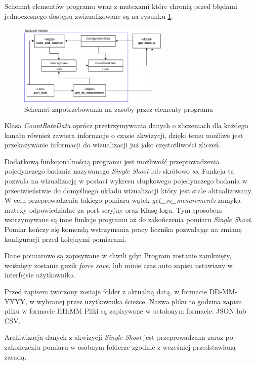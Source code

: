 \documentclass[a4paper,12pt]{article}
\begin{document}
Schemat elementów programu wraz z mutexami które chronią przed błędami jednoczesnego dostępu zwizualizowane są na rysunku \ref{program zapotrzebowanie}.

\begin{figure}
        \centering
        \includegraphics[width=0.65\textwidth]{Schemat_zapotrzebowania.png}
        \caption{Schemat zapotrzebowania na zasoby przez elementy programu}
        \label{program zapotrzebowanie}
\end{figure}

Klasa \textit{CountRateData} oprócz przetrzymywania danych o zliczeniach dla każdego kanału również zawiera informacje o czasie akwizycji, dzięki temu możliwe jest przekazywanie informacji do wizualizacji już jako częstotliwości zliczeń. 

Dodatkową funkcjonalnością programu jest możliwość przeprowadzenia pojedynczego badania nazywanego \textit{Single Shoot} lub skrótowo \textit{ss}.
Funkcja ta pozwala na wizualizację w postaci wykresu słupkowego pojedynczego badania w przeciwieństwie do domyślnego układu wizualizacji który jest stale aktualizowany. 
W celu przeprowadzenia takiego pomiaru wątek \textit{get\_ss\_mesurements} zamyka mutexy odpowiedzialne za port seryjny oraz Klasę logu. 
Tym sposobem wstrzymywane są inne funkcje programu aż do zakończenia pomiaru \textit{Single Shoot}.
Pomiar kończy się komendą wstrzymania pracy licznika pozwalając na zmianę konfiguracji przed kolejnymi pomiarami.  

Dane pomiarowe są zapisywane w chwili gdy: Program zostanie zamknięty, wciśnięty zostanie guzik \textit{force save}, lub minie czas auto zapisu ustawiany w interfejsie użytkownika. 

Przed zapisem tworzony zostaje folder z aktualną datą, w formacie DD-MM-YYYY, w wybranej przez użytkownika ścieżce. Nazwa pliku to godzina zapisu pliku w formacie HH:MM
Pliki są zapisywane w ustalonym formacie: JSON lub CSV.

Archiwizacja danych z akwizycji \textit{Single Shoot} jest przeprowadzana zaraz po zakończeniu pomiaru w osobnym folderze zgodnie z wcześniej przedstawioną zasadą. 
\end{document}
